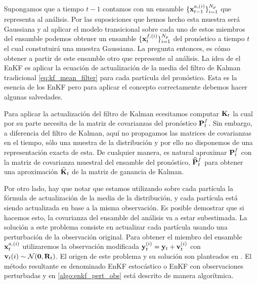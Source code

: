 Supongamos que a tiempo $t-1$ contamos con un ensamble $\{ \mathbf{x}_{t-1}^{a, (i)} \}_{i=1}^{N_p}$ que representa al análisis. Por las suposiciones que hemos hecho esta muestra será Gaussiana y al aplicar el modelo transicional sobre cada uno de estos miembros del ensamble podemos obtener un ensamble $\{ \mathbf{x}_{t}^{f, (i)} \}_{i=1}^{N_p}$ del pronóstico a tiempo $t$ el cual constutuirá una muestra Gaussiana. La pregunta entonces, es cómo obtener a partir de este ensamble otro que represente al análisis. La idea de el EnKF es aplicar la ecuación de actualización de la media del filtro de Kalman tradicional \ref{eq:kf_mean_filter} para cada partícula del pronóstico. Esta es la esencia de los EnKF pero para aplicar el concepto correctamente debemos hacer algunas salvedades.

Para aplicar la actualización del filtro de Kalman ecesitamos computar $\mathbf{K}_t$ la cual por su parte necesita de la matriz de covarianzas del pronóstico $\mathbf{P}_t^f$. Sin embargo, a diferencia del filtro de Kalman, aquí no propagamos las matrices de covarianzas en el tiempo, sólo una muestra de la distribución y por ello no disponemos de una representación exacta de esta. De cualquier manera, es natural aproximar $\mathbf{P}_t^f$ con la matriz de covarianza muestral del ensamble del pronóstico, $\widehat{\mathbf{P}}_t^f$ para obtener una aproximación $\widehat{\mathbf{K}}_t$ de la matriz de ganancia de Kalman.

Por otro lado, hay que notar que estamos utilizando sobre cada partícula la fórmula de actualización de la media de la distribución, y cada partícula está siendo actualizada en base a la misma observación. Es posible demostrar que si hacemos esto, la covarianza del ensamble del análisis va a estar subestimada. La solución a este problema consiste en actualizar cada partícula usando una perturbación de la observación original. Para obtener el miembro del ensamble $\mathbf{x}_t^{a, (i)}$ utilizaremos la observación modificada $\mathbf{y}_t^{(i)} = \mathbf{y}_t + \mathbf{v}_t^{(i)}$ con $\mathbf{v}_t{(i)} \sim \mathcal{N}(\mathbf{0}, \mathbf{R}_t)$. El origen de este problema y su solución son planteados en \cite{Burgers1998}. El método resultante es denominado EnKF estocástico o EnKF con observaciones perturbadas y en \ref{algo:enkf_pert_obs} está descrito de manera algorítmica.

